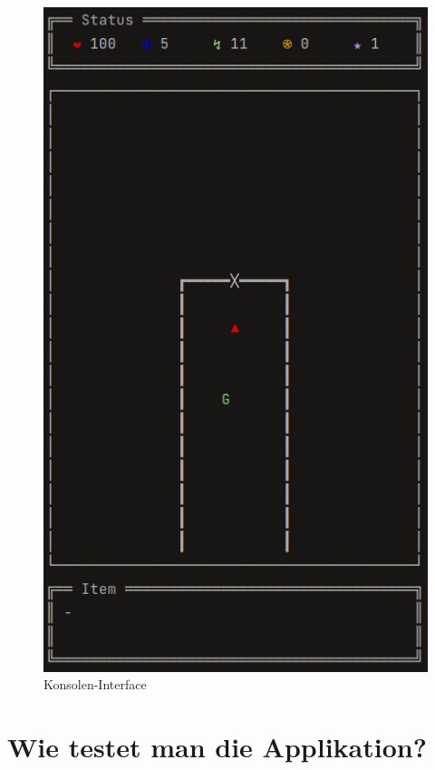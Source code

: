 \vspace{0.5cm}
\begin{figure}[H]
    \centering
    \includegraphics[width=0.6\linewidth]{Bilder/Visualisierung/GameLook.png}
    \caption{Konsolen-Interface}
\end{figure}

\section{Wie testet man die Applikation?}
